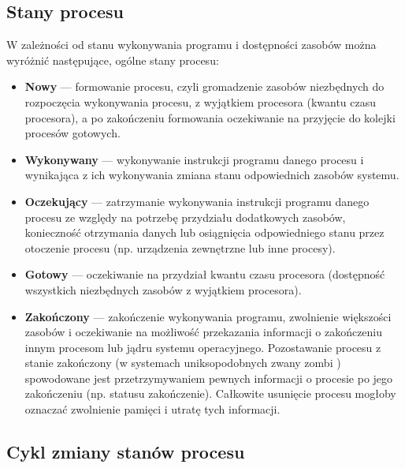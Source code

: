 \documentclass[main.tex]{subfiles}
\begin{document}
    \subsection{Stany procesu}

    W zależności od stanu wykonywania programu i dostępności zasobów można wyróżnić następujące, ogólne stany procesu:

    \begin{itemize}
        \item \textbf{Nowy} — formowanie procesu, czyli gromadzenie zasobów niezbędnych do rozpoczęcia wykonywania procesu, z wyjątkiem procesora (kwantu czasu procesora), a po zakończeniu formowania oczekiwanie na przyjęcie do kolejki procesów gotowych.
        \item \textbf{Wykonywany} — wykonywanie instrukcji programu danego procesu i wynikająca z ich wykonywania zmiana stanu odpowiednich zasobów systemu.
        \item \textbf{Oczekujący} — zatrzymanie wykonywania instrukcji programu danego procesu ze względy na potrzebę przydziału dodatkowych zasobów, konieczność otrzymania danych lub osiągnięcia odpowiedniego stanu przez otoczenie procesu (np. urządzenia zewnętrzne lub inne procesy).
        \item \textbf{Gotowy} — oczekiwanie na przydział kwantu czasu procesora (dostępność wszystkich niezbędnych zasobów z wyjątkiem procesora).
        \item \textbf{Zakończony} — zakończenie wykonywania programu, zwolnienie większości zasobów i oczekiwanie na możliwość przekazania informacji o zakończeniu innym procesom lub jądru systemu operacyjnego.
        Pozostawanie procesu z stanie zakończony (w systemach uniksopodobnych zwany zombi ) spowodowane jest przetrzymywaniem pewnych informacji o procesie po jego zakończeniu (np. statusu zakończenie). Całkowite usunięcie procesu mogłoby oznaczać zwolnienie pamięci i utratę tych informacji.
    \end{itemize}

    \subsection{Cykl zmiany stanów procesu}
\end{document}
